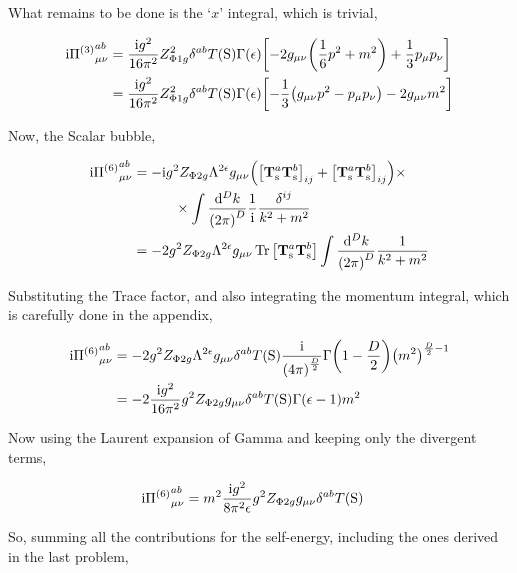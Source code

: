 What remains to be done is the `$x$' integral, which is trivial,

\begin{align}
    \textnormal{i} {\Pi^{\qty(3)}}^{ab}_{\mu\nu}&=\frac{\textnormal{i} g^2}{16\pi^2}Z^2_{\Phi1g}\delta^{ab}T\qty(\textnormal{S})
    \Gamma\qty(\epsilon)\qty[-2g_{\mu\nu}\qty(\frac16p^2+m^2)+\frac13p_\mu p_\nu]\nonumber\\
    &=\frac{\textnormal{i} g^2}{16\pi^2}Z^2_{\Phi1g}\delta^{ab}T\qty(\textnormal{S})
    \Gamma\qty(\epsilon)\qty[-\frac13\qty(g_{\mu\nu}p^2-p_\mu p_\nu)-2g_{\mu\nu}m^2]\nonumber
\end{align}

Now, the Scalar bubble,

\begin{align}
    \textnormal{i} {\Pi^{\qty(6)}}^{ab}_{\mu\nu}&=-\textnormal{i} g^2Z_{\Phi2g}\Lambda^{2\epsilon}g_{\mu\nu}
    \qty(\qty[\vb T^a_{\textnormal{s}}\vb T^b_{\textnormal{s}}]_{ij}
        +\qty[\vb T^a_{\textnormal{s}}\vb T^b_{\textnormal{s}}]_{ij})\times\nonumber\\
    &\quad\quad\quad\times\int\frac{\dd[D]{k}}{\qty(2\pi)^D}\frac1{\textnormal{i}}\frac{\delta^{ij}}{k^2+m^2}\nonumber\\
    &=-2g^2Z_{\Phi2g}\Lambda^{2\epsilon}g_{\mu\nu}
    \Tr\qty[\vb T^a_{\textnormal{s}}\vb T^b_{\textnormal{s}}]\int\frac{\dd[D]{k}}{\qty(2\pi)^D}\frac{1}{k^2+m^2}\nonumber
\end{align}

Substituting the Trace factor, and also integrating the momentum 
integral, which is carefully done in the appendix,

\begin{align}
    \textnormal{i} {\Pi^{\qty(6)}}^{ab}_{\mu\nu}&=-2g^2Z_{\Phi2g}\Lambda^{2\epsilon}g_{\mu\nu}
    \delta^{ab}T\qty(\textnormal S)\frac{\textnormal{i}}{\qty(4\pi)^{\frac D2}}\Gamma\qty(1-\frac D2)\qty(m^2)^{\frac D2-1}\nonumber\\
    &=-2\frac{\textnormal{i} g^2}{16\pi^2}g^2Z_{\Phi2g}g_{\mu\nu}
    \delta^{ab}T\qty(\textnormal S)\Gamma\qty(\epsilon-1)m^2\nonumber
\end{align}

Now using the Laurent expansion of Gamma and keeping only the divergent 
terms,

\begin{align}
    \textnormal{i} {\Pi^{\qty(6)}}^{ab}_{\mu\nu}&=m^2\frac{\textnormal{i} g^2}{8\pi^2\epsilon}g^2Z_{\Phi2g}g_{\mu\nu}
    \delta^{ab}T\qty(\textnormal S)\nonumber
\end{align}

So, summing all the contributions for the self-energy, including the ones 
derived in the last problem,

